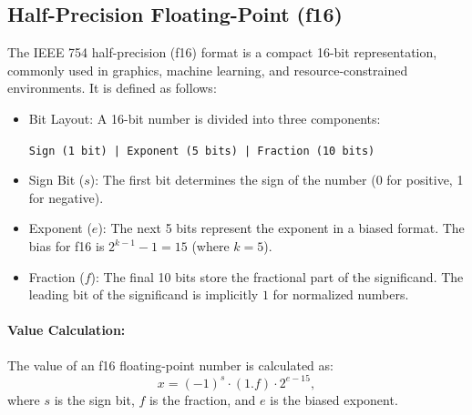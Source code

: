 \subsection{Half-Precision Floating-Point (f16)}

The IEEE 754 half-precision (f16) format is a compact 16-bit representation, commonly used in graphics, machine learning, and resource-constrained environments. It is defined as follows:

\begin{itemize}
    \item Bit Layout: A 16-bit number is divided into three components:
    \begin{center}
    \texttt{Sign (1 bit) | Exponent (5 bits) | Fraction (10 bits)}
    \end{center}
    \item Sign Bit (\( s \)): The first bit determines the sign of the number (0 for positive, 1 for negative).
    \item Exponent (\( e \)): The next 5 bits represent the exponent in a biased format. The bias for f16 is \( 2^{k-1} - 1 = 15 \) (where \( k = 5 \)).
    \item Fraction (\( f \)): The final 10 bits store the fractional part of the significand. The leading bit of the significand is implicitly \( 1 \) for normalized numbers.
\end{itemize}

\paragraph{Value Calculation:}
The value of an f16 floating-point number is calculated as:
\[
x = (-1)^s \cdot (1.f) \cdot 2^{e - 15},
\]
where \( s \) is the sign bit, \( f \) is the fraction, and \( e \) is the biased exponent.

